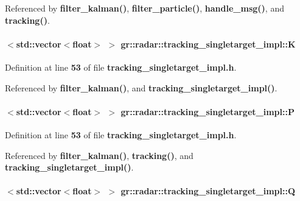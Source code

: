 Referenced by {\bf filter\+\_\+kalman()}, {\bf filter\+\_\+particle()}, {\bf handle\+\_\+msg()}, and {\bf tracking()}.

\paragraph[{K}]{$<${\bf std\+::vector}$<$float$>$ $>$ gr\+::radar\+::tracking\+\_\+singletarget\+\_\+impl\+::K}\label{classgr_1_1radar_1_1tracking__singletarget__impl_adfcfb45f9d3cfd9c3dbc2993c2812024}


Definition at line {\bf 53} of file {\bf tracking\+\_\+singletarget\+\_\+impl.\+h}.



Referenced by {\bf filter\+\_\+kalman()}, and {\bf tracking\+\_\+singletarget\+\_\+impl()}.

\paragraph[{P}]{$<${\bf std\+::vector}$<$float$>$ $>$ gr\+::radar\+::tracking\+\_\+singletarget\+\_\+impl\+::P}\label{classgr_1_1radar_1_1tracking__singletarget__impl_a7af291fd31ec439e2123cba54993fb58}


Definition at line {\bf 53} of file {\bf tracking\+\_\+singletarget\+\_\+impl.\+h}.



Referenced by {\bf filter\+\_\+kalman()}, {\bf tracking()}, and {\bf tracking\+\_\+singletarget\+\_\+impl()}.

\paragraph[{Q}]{$<${\bf std\+::vector}$<$float$>$ $>$ gr\+::radar\+::tracking\+\_\+singletarget\+\_\+impl\+::Q}\label{classgr_1_1radar_1_1tracking__singletarget__impl_aec83f1c92414cbedcaf1fe2187155ffa}



